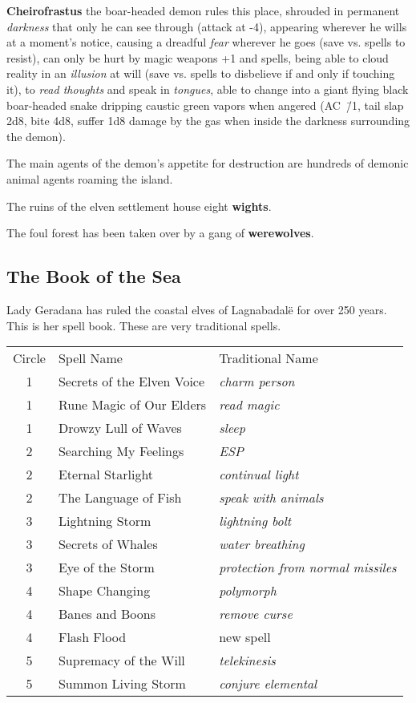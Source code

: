 \documentclass[a4paper,serif]{rpg-module}
\begin{document}
\textbf{Cheirofrastus} the boar-headed demon rules this place,
shrouded in permanent \emph{darkness} that only he can see through
(attack at -4), appearing wherever he wills at a moment's notice,
causing a dreadful \emph{fear} wherever he goes (save vs. spells to
resist), can only be hurt by magic weapons +1 and spells, being able
to cloud reality in an \emph{illusion} at will (save vs. spells to
disbelieve if and only if touching it), to \emph{read thoughts} and
speak in \emph{tongues}, able to change into a giant flying black
boar-headed snake dripping caustic green vapors when angered (AC~\=/1,
tail slap 2d8, bite 4d8, suffer 1d8 damage by the gas when inside the
darkness surrounding the demon).

The main agents of the demon's appetite for destruction are hundreds
of demonic animal agents roaming the island.

The ruins of the elven settlement house eight \textbf{wights}.

The foul forest has been taken over by a gang of \textbf{werewolves}.

\subsection{The Book of the Sea}
\label{sec:book-of-the-sea}

Lady Geradana has ruled the coastal elves of Lagnabadalë for over 250
years. This is her spell book. These are very traditional spells.

\begin{table*}[!ht]
  \small
  \centering
  \begin{tabular}{cll}
    Circle & Spell Name & Traditional Name \\
    \cmidrule(lr){1-1}\cmidrule(lr){2-2}\cmidrule(lr){3-3}
    1 & Secrets of the Elven Voice & \emph{charm person} \\
    1 & Rune Magic of Our Elders & \emph{read magic} \\
    1 & Drowzy Lull of Waves & \emph{sleep} \\
    2 & Searching My Feelings & \emph{ESP} \\
    2 & Eternal Starlight & \emph{continual light} \\
    2 & The Language of Fish & \emph{speak with animals} \\
    3 & Lightning Storm & \emph{lightning bolt} \\
    3 & Secrets of Whales & \emph{water breathing} \\
    3 & Eye of the Storm & \emph{protection from normal missiles} \\
    4 & Shape Changing & \emph{polymorph}\\
    4 & Banes and Boons & \emph{remove curse} \\
    4 & Flash Flood & new spell \\
    5 & Supremacy of the Will & \emph{telekinesis} \\
    5 & Summon Living Storm & \emph{conjure elemental} \\
  \end{tabular}
\end{table*}
\end{document}
